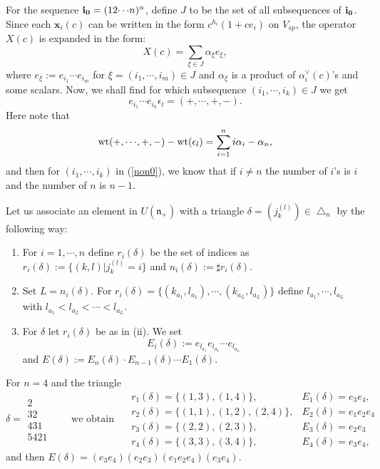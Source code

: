 For the sequence $\bfii0=(12{\cdots} n)^n$, 
define $J$ to be the set of all subsequences of $\bfii0$.
Since each ${\pmb x}_i(c)$ can be written in the form $c^{h_i}(1+ce_i)$ on 
$V_{sp}$,
the operator $X(c)$ is expanded in the form:
\begin{equation}\label{expand}
X(c)=\sum_{\xi\in J}{\alpha}_\xi e_\xi,
\end{equation}
where $e_\xi:=e_{i_1}{\cdots} e_{i_m}$ for 
$\xi=(i_1,{\cdots},i_m)\in J$ and ${\alpha}_\xi$ 
is a product of ${\alpha}_i^\vee(c)$'s
and some scalars. 
Now, we shall find for which subsequence $(i_1,{\cdots},i_k)\in J$ we get
\begin{equation}\label{non0}
 e_{i_1}{\cdots} e_{i_k}{\epsilon}_l=(+,{\cdots},+,-).
\end{equation}
Here note that 
\begin{equation}\label{wt-dif}
{{\rm wt}}(+,{\cdots},+,-)-{{\rm wt}}({\epsilon}_l)=\sum_{i=1}^ni{\alpha}_i-{\alpha}_n,
\end{equation}
and then for $(i_1,{\cdots},i_k)$ in (\ref{non0}), we know that
if $i\ne n$ the number of $i$'s is $i$ and the number of $n$ is 
$n-1$. 

Let us associate an element in $U({\mathfrak n}_+)$ with 
a triangle ${\delta}=({j_{k}^{(l)}})\in {\bigtriangleup}_n$ by the following way:
\begin{enumerate}
\item
For $i=1,{\cdots},n$ define $r_i({\delta})$ be the set of indices as
$r_i({\delta}):=\{(k,l)|{j_{k}^{(l)}}=i\}$ and 
$n_i({\delta}):=\sharp r_i({\delta})$.
\item
Set $L=n_i({\delta})$. 
For $r_i({\delta})=\{(k_{a_1},l_{a_1}),{\cdots},(k_{a_{L}},l_{a_L})\}$
define  $l_{a_1},{\cdots},l_{a_L}$ with $l_{a_1}<l_{a_2}<{\cdots}<l_{a_L}$.
\item For ${\delta}$ let $r_i({\delta})$ be as in (ii).  We set 
\[
 E_i({\delta}):=e_{l_{a_1}}e_{l_{a_2}}{\cdots} e_{l_{a_L}}
\]
and $E({\delta}):=E_n({\delta})\cdot E_{n-1}({\delta}){\cdots} E_1({\delta})$.
\end{enumerate}
\begin{ex}\label{EX-B}
For $n=4$ and the triangle 
\[
{\delta}=\begin{array}{c}
2\\32\\431\\5421
\end{array}{\qquad}
\text{we obtain }{\quad}
\begin{array}{ll}
r_1({\delta})=\{(1,3),(1,4)\},&E_1({\delta})=e_3e_4,\\
r_2({\delta})=\{(1,1),(1,2),(2,4)\},&E_2({\delta})=e_1e_2e_4\\
r_3({\delta})=\{(2,2),(2,3)\},&E_3({\delta})=e_2e_3\\
r_4({\delta})=\{(3,3),(3,4)\},&E_4({\delta})=e_3e_4,
\end{array}
\]
and then $E({\delta})=(e_3e_4)(e_2e_3)(e_1e_2e_4)(e_3e_4)$.
\end{ex}

